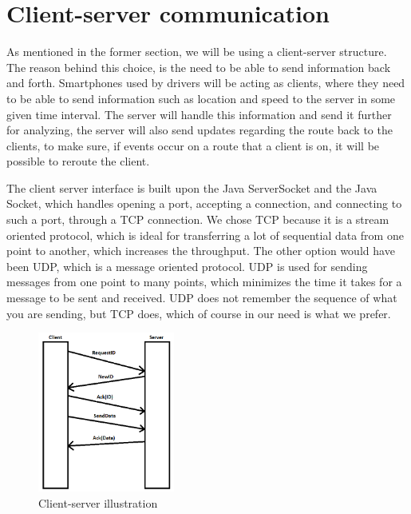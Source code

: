 \section{Client-server communication} 
\label{chap:clientserver}
As mentioned in the former section, we will be using a client-server structure.
The reason behind this choice, is the need to be able to send information back and forth.
Smartphones used by drivers will be acting as clients,
where they need to be able to send information such as location and speed to the server in some given time interval.
The server will handle this information and send it further for analyzing,
the server will also send updates regarding the route back to the clients,
to make sure, if events occur on a route that a client is on, it will be possible to reroute the client.

The client server interface is built upon the Java ServerSocket and the Java Socket,
which handles opening a port, accepting a connection, and connecting to such a port, through a TCP connection. 
We chose TCP because it is a stream oriented protocol,
which is ideal for transferring a lot of sequential data from one point to another, which increases the throughput.
The other option would have been UDP, which is a message oriented protocol.
UDP is used for sending messages from one point to many points,
which minimizes the time it takes for a message to be sent and received.
UDP does not remember the sequence of what you are sending, but TCP does, which of course in our need is what we prefer. 

\begin{figure}[h!]
  \centering
    \includegraphics[width=0.4\textwidth]{figures/clientserver.png}
    \caption{Client-server illustration}
    \label{fig:clientserver}
\end{figure}

